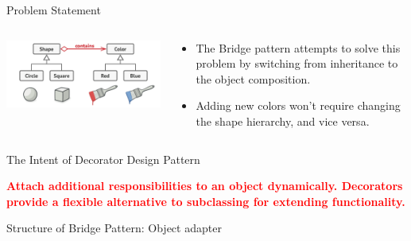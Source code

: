 \documentclass[13pt]{beamer}
\begin{document}
\begin{frame}{Problem Statement}
	\begin{columns}[T]
		\begin{column}{.5\textwidth}
			\includegraphics[scale=0.45]{./images/solution.png}
		\end{column}
	
		\begin{column}{.4\textwidth}
			\begin{itemize}
				\item The Bridge pattern attempts to solve this problem by switching from inheritance to the object composition.
				\item Adding new colors won’t require changing the shape hierarchy, and vice versa.
			\end{itemize}
		\end{column}
	\end{columns}
\end{frame}

\begin{frame}{The Intent of Decorator Design Pattern}
	\begin{center}
	\textcolor{red}{\textbf{Attach additional responsibilities to an object dynamically. Decorators provide a flexible alternative to subclassing for extending functionality.}}
	\end{center}
\end{frame}

\begin{frame}{Structure of Bridge Pattern: Object adapter}
	\begin{center}
	\end{center}
\end{frame}
\end{document}
